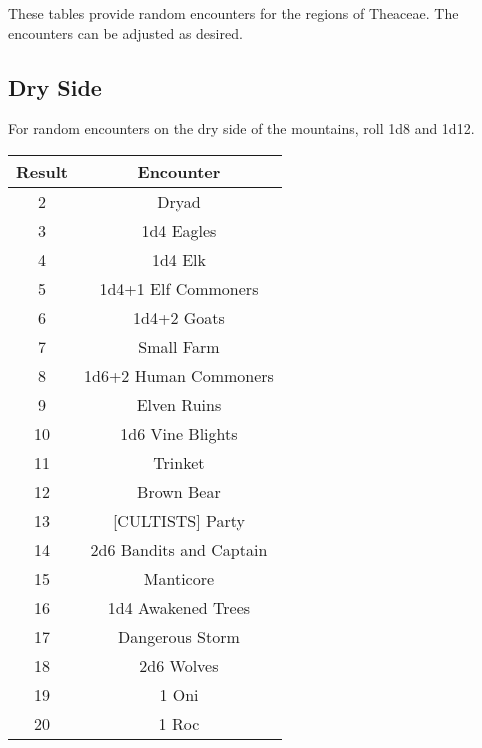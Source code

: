 These tables provide random encounters for the regions of Theaceae. The encounters can be adjusted as desired.

\subsection{Dry Side}

For random encounters on the dry side of the mountains, roll 1d8 and 1d12.

\begin{tabular}{|c|c|}

\hline

\textbf{Result} & \textbf{Encounter}\\

\hline

2 & Dryad\\

3 & 1d4 Eagles\\

4 & 1d4 Elk\\

5 & 1d4+1 Elf Commoners\\

6 & 1d4+2 Goats\\

7 & Small Farm\\

8 & 1d6+2 Human Commoners\\

9 & Elven Ruins\\

10 & 1d6 Vine Blights\\

11 & Trinket\\

12 & Brown Bear\\

13 & [CULTISTS] Party\\

14 & 2d6 Bandits and Captain\\

15 & Manticore\\

16 & 1d4 Awakened Trees\\

17 & Dangerous Storm\\

18 & 2d6 Wolves\\

19 & 1 Oni\\

20 & 1 Roc\\

\hline

\end{tabular}


